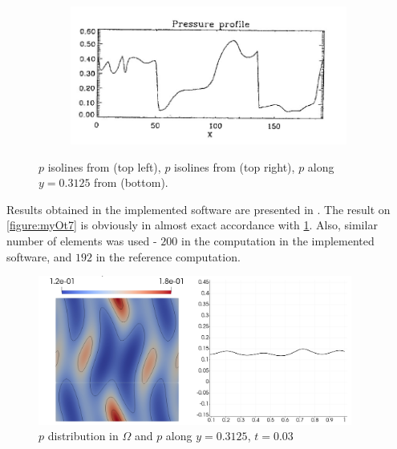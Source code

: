 \begin{figure}[H]
\\
\begin{subfigure}[b]{0.75\textwidth}\includegraphics[width=\textwidth]{img/ot/ref-zachary-pressure-profile.jpg}\end{subfigure}
\caption{$p$ isolines from \cite{blast1} (top left), $p$ isolines from \cite{blast0} (top right), $p$ along $y = 0.3125$ from \cite{blast0} (bottom).}
\label{figure:otRef}
\end{figure}

Results obtained in the implemented software are presented in . The result on \cref{figure:myOt7} is obviously in almost exact accordance with \cref{figure:otRef}. Also, similar number of elements was used - $200$ in the computation in the implemented software, and $192$ in the reference computation.

\begin{figure}[H]
	\centering
	\includegraphics[width=0.92\textwidth]{img/ot/my1new.jpg}
\vspace{-2mm}
\caption{$p$ distribution in $\Omega$ and $p$ along $y = 0.3125$, $t = 0.03$}
\label{figure:myOt1}
\end{figure}
\vspace{-4mm}

